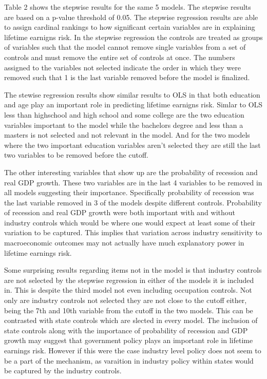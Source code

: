 \documentclass[12pt]{article}
\begin{document}
\begin{onehalfspace}


Table 2 shows the stepwise results for the same 5 models. The stepwise results are based on a p-value threshold of 0.05. The stepwise regression results are able to assign cardinal rankings to how significant certain variables are in explaining lifetime earnigns risk. In the stepwise regression the controls are treated as groups of variables such that the model cannot remove single variables from a set of controls and must remove the entire set of controls at once. The numbers assigned to the variables not selected indicate the order in which they were removed such that 1 is the last variable removed before the model is finalized.

The stewise regression results show similar results to OLS in that both education and age play an important role in predicting lifetime earnigns risk. Simlar to OLS less than highschool and high school and some college are the two education variables important to the model while the bachelors degree and less than a masters is not selected and not relevant in the model. And for the two models where the two important education variables aren't selected they are still the last two variables to be removed before the cutoff. 

The other interesting variables that show up are the probability of recession and real GDP growth. These two variables are in the last 4 variables to be removed in all models suggesting their importance. Specifically probability of recession was the last variable removed in 3 of the models despite different controls. Probability of recession and real GDP growth were both important with and without industry controls which would be where one would expect at least some of their variation to be captured. This implies that variation across industry sensitivity to macroeconomic outcomes may not actually have much explanatory power in lifetime earnings risk.

Some surprising results regarding items not in the model is that industry controls are not selected by the stepwise regression in either of the models it is included in. This is despite the third model not even including occupation controls. Not only are industry controls not selected they are not close to the cutoff either, being the 7th and 10th variable from the cutoff in the two models. This can be contrasted with state controls which are slected in every model. The inclusion of state controls along with the importance of probability of recession and GDP growth may suggest that government policy plays an important role in lifetime earnings risk. However if this were the case industry level policy does not seem to be a part of the mechanism, as varaition in industry policy within states would be captured by the industry controls.


\end{onehalfspace}
\end{document}
